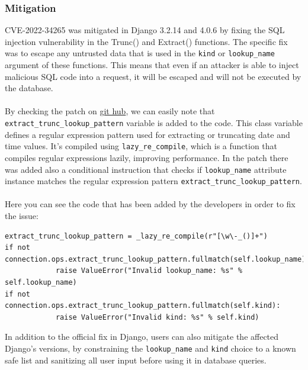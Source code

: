 \documentclass{article}
\begin{document}
	\subsubsection{Mitigation}
	 CVE-2022-34265 was mitigated in Django 3.2.14 and 4.0.6 by fixing the SQL injection vulnerability in the Trunc() and Extract() functions. The specific fix was to escape any untrusted data that is used in the \verb|kind| or \verb|lookup_name| argument of these functions. This means that even if an attacker is able to inject malicious SQL code into a request, it will be escaped and will not be executed by the database. \\ \\
	  By checking the patch on \href{https://github.com/django/django/commit/0dc9c016fadb71a067e5a42be30164e3f96c0492}{git hub}, we can easily note that \verb|extract_trunc_lookup_pattern| variable is added to the code. This class variable defines a regular expression pattern used for extracting or truncating date and time values. It's compiled using \verb|lazy_re_compile|, which is a function that compiles regular expressions lazily, improving performance. In the patch there was added also a conditional instruction that checks if \verb|lookup_name| attribute instance matches the regular expression pattern \verb|extract_trunc_lookup_pattern|. \\  \\
	  Here you can see the code that has been added by the developers in order to fix the issue:
	  \begin{lstlisting}[style=Python]
extract_trunc_lookup_pattern = _lazy_re_compile(r"[\w\-_()]+")
if not connection.ops.extract_trunc_lookup_pattern.fullmatch(self.lookup_name):
            raise ValueError("Invalid lookup_name: %s" % self.lookup_name)
if not connection.ops.extract_trunc_lookup_pattern.fullmatch(self.kind):
            raise ValueError("Invalid kind: %s" % self.kind)
	\end{lstlisting}
	  In addition to the official fix in Django, users can also mitigate the affected Django's versions, by constraining the \verb|lookup_name| and \verb|kind| choice to a known safe list and sanitizing all user input before using it in database queries.
	  \newpage
\end{document}
